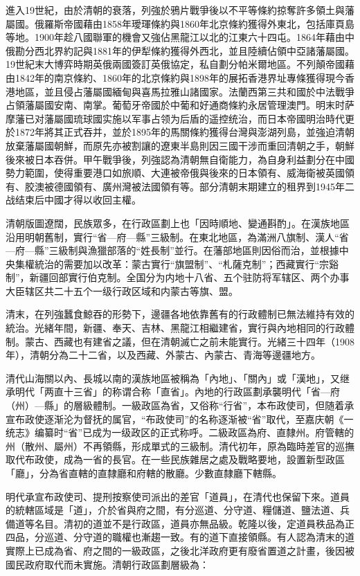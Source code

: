 進入19世紀，由於清朝的衰落，列強於鴉片戰爭後以不平等條約掠奪許多領土與藩屬國。俄羅斯帝國藉由1858年璦琿條約與1860年北京條約獲得外東北，包括庫頁島等地。1900年趁八國聯軍的機會又強佔黑龍江以北的江東六十四屯。1864年藉由中俄勘分西北界約記與1881年的伊犁條約獲得外西北，並且陸續佔領中亞諸藩屬國。19世紀末大博弈時期英俄兩國簽訂英俄協定，私自劃分帕米爾地區。不列顛帝國藉由1842年的南京條約、1860年的北京條約與1898年的展拓香港界址專條獲得現今香港地區，並且侵占藩屬國緬甸與喜馬拉雅山諸國家。法蘭西第三共和國於中法戰爭占領藩屬國安南、南掌。葡萄牙帝國於中葡和好通商條約永居管理澳門。明末时萨摩藩已对藩屬國琉球國实施以军事占领为后盾的遥控统治，而日本帝國明治時代更於1872年將其正式吞并，並於1895年的馬關條約獲得台灣與澎湖列島，並強迫清朝放棄藩屬國朝鮮，而原先亦被割讓的遼東半島則因三國干涉而重回清朝之手，朝鮮後來被日本吞併。甲午戰爭後，列強認為清朝無自衛能力，為自身利益劃分在中國勢力範圍，使得重要港口如旅順、大連被帝俄與後來的日本領有、威海衛被英國領有、胶澳被德國領有、廣州灣被法國領有等。部分清朝末期建立的租界到1945年二战结束后中國才得以收回主權。

清朝版圖遼闊，民族眾多，在行政區劃上也「因時順地、變通斟酌」。在漢族地區沿用明朝舊制，實行“省—府—縣”三級制。在東北地區，為滿洲八旗制、漢人“省—府—縣”三級制與漁獵部落的“姓長制”並行。在藩部地區則因俗而治，並根據中央集權統治的需要加以改革：蒙古實行“旗盟制”、“札薩克制”；西藏實行“宗谿制”，新疆回部實行伯克制。全国分为内地十八省、五个驻防将军辖区、两个办事大臣辖区共二十五个一级行政区域和内蒙古等旗、盟。

清末，在列強蠶食鯨吞的形勢下，邊疆各地依靠舊有的行政體制已無法維持有效的統治。光緒年間，新疆、奉天、吉林、黑龍江相繼建省，實行與內地相同的行政體制。蒙古、西藏也有建省之議，但在清朝滅亡之前未能實行。光緒三十四年（1908年），清朝分為二十二省，以及西藏、外蒙古、內蒙古、青海等邊疆地方。

清代山海關以內、長城以南的漢族地區被稱為「內地」、「關內」或「漢地」，又继承明代「两直十三省」的称谓合称「直省」。內地的行政區劃承襲明代「省—府（州）—縣」的層級體制。一級政區為省，又俗称“行省”，本布政使司，但随着承宣布政使逐渐沦为督抚的属官，“布政使司”的名称逐渐被“省”取代，至嘉庆朝《一统志》编纂时“省”已成为一级政区的正式称呼。二級政區為府、直隸州。府管轄的州（散州、屬州）不再領縣，形成單式的三級制。清代初年，原為臨時差官的巡撫取代布政使，成為一省的長官。在一些民族雜居之處及戰略要地，設置新型政區「廳」，分為省直轄的直隸廳和府轄的散廳。少數直隸廳下轄縣。

明代承宣布政使司、提刑按察使司派出的差官「道員」，在清代也保留下來。道員的統轄區域是「道」，介於省與府之間，有分巡道、分守道、糧儲道、鹽法道、兵備道等名目。清初的道並不是行政區，道員亦無品級。乾隆以後，定道員秩品為正四品，分巡道、分守道的職權也漸趨一致。有的道下直接領縣。有人認為清末的道實際上已成為省、府之間的一級政區，之後北洋政府更有廢省置道之計畫，後因被國民政府取代而未實施。清朝行政區劃層級為：

